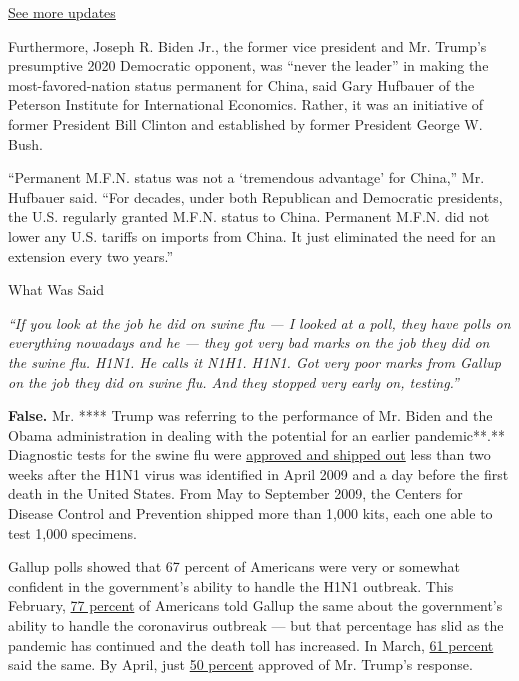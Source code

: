 \href{https://www.nytimes3xbfgragh.onion/2020/08/03/us/elections/biden-vs-trump.html?action=click\&pgtype=Article\&state=default\&region=MAIN_CONTENT_1\&context=storylines_live_updates}{See
more updates}

Furthermore, Joseph R. Biden Jr., the former vice president and Mr.
Trump's presumptive 2020 Democratic opponent, was ``never the leader''
in making the most-favored-nation status permanent for China, said Gary
Hufbauer of the Peterson Institute for International Economics. Rather,
it was an initiative of former President Bill Clinton and established by
former President George W. Bush.

``Permanent M.F.N. status was not a `tremendous advantage' for China,''
Mr. Hufbauer said. ``For decades, under both Republican and Democratic
presidents, the U.S. regularly granted M.F.N. status to China. Permanent
M.F.N. did not lower any U.S. tariffs on imports from China. It just
eliminated the need for an extension every two years.''

What Was Said

\emph{``If you look at the job he did on swine flu --- I looked at a
poll, they have polls on everything nowadays and he --- they got very
bad marks on the job they did on the swine flu. H1N1. He calls it N1H1.
H1N1. Got very poor marks from Gallup on the job they did on swine flu.
And they stopped very early on, testing.''}

\textbf{False.} Mr. **** Trump was referring to the performance of Mr.
Biden and the Obama administration in dealing with the potential for an
earlier pandemic**.** Diagnostic tests for the swine flu were
\href{https://www.nytimes3xbfgragh.onion/2020/03/13/us/politics/fact-check-trump-coronavirus.html}{approved
and shipped out} less than two weeks after the H1N1 virus was identified
in April 2009 and a day before the first death in the United States.
From May to September 2009, the Centers for Disease Control and
Prevention shipped more than 1,000 kits, each one able to test 1,000
specimens.

Gallup polls showed that 67 percent of Americans were very or somewhat
confident in the government's ability to handle the H1N1 outbreak. This
February,
\href{https://news.gallup.com/poll/286277/high-confidence-government-handle-coronavirus.aspx}{77
percent} of Americans told Gallup the same about the government's
ability to handle the coronavirus outbreak --- but that percentage has
slid as the pandemic has continued and the death toll has increased. In
March,
\href{https://news.gallup.com/opinion/polling-matters/296681/ten-key-findings-public-opinion-coronavirus.aspx}{61
percent} said the same. By April, just
\href{https://news.gallup.com/poll/309614/health-institutions-rated-best-covid-response.aspx}{50
percent} approved of Mr. Trump's response.

